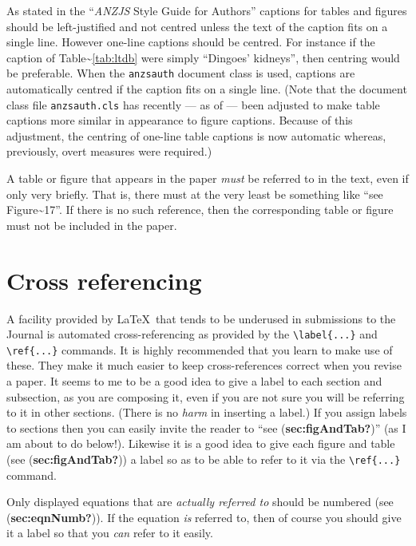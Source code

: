 \documentclass[
  times,
  doublespace]{anzsauth}
\begin{document}
As stated in the ``\emph{ANZJS} Style Guide for Authors'' captions for
tables and figures should be left-justified and not centred unless the
text of the caption fits on a single line. However one-line captions
should be centred. For instance if the caption of
Table\textasciitilde{}\ref{tab:ltdb} were simply ``Dingoes' kidneys'',
then centring would be preferable. When the \texttt{anzsauth} document
class is used, captions are automatically centred if the caption fits on
a single line. (Note that the document class file \texttt{anzsauth.cls}
has recently --- as of  --- been adjusted to
make table captions more similar in appearance to figure captions.
Because of this adjustment, the centring of one-line table captions is
now automatic whereas, previously, overt measures were required.)

A table or figure that appears in the paper \emph{must} be referred to
in the text, even if only very briefly. That is, there must at the very
least be something like ``see Figure\textasciitilde17''. If there is no
such reference, then the corresponding table or figure must not be
included in the paper.

\section{Cross referencing}\label{sec:crossref}

A facility provided by \LaTeX~that tends to be underused in submissions
to the Journal is automated cross-referencing as provided by the
\texttt{\textbackslash{}label\{...\}} and
\texttt{\textbackslash{}ref\{...\}} commands. It is highly recommended
that you learn to make use of these. They make it much easier to keep
cross-references correct when you revise a paper. It seems to me to be a
good idea to give a label to each section and subsection, as you are
composing it, even if you are not sure you will be referring to it in
other sections. (There is no \emph{harm} in inserting a label.) If you
assign labels to sections then you can easily invite the reader to ``see
(\textbf{sec:figAndTab?})'' (as I am about to do below!). Likewise it is
a good idea to give each figure and table (see
(\textbf{sec:figAndTab?})) a label so as to be able to refer to it via
the \texttt{\textbackslash{}ref\{...\}} command.

Only displayed equations that are \emph{actually referred to} should be
numbered (see (\textbf{sec:eqnNumb?})). If the equation \emph{is}
referred to, then of course you should give it a label so that you
\emph{can} refer to it easily.
\end{document}
